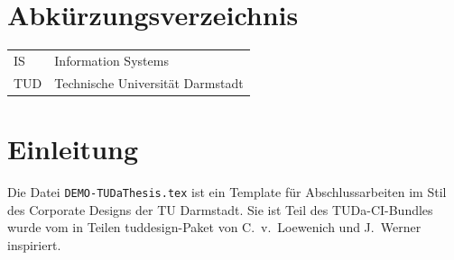 \documentclass[
	ngerman,
	ruledheaders=section,%
	class=report,%
	thesis={type=bachelor},%
	accentcolor=1b,%
	custommargins=true,%
	marginpar=false,%
	parskip=half-,%
	fontsize=11pt,%
	DIV=14,
]{tudapub}
\let\file\texttt
\begin{document}
\listoffigures
{}           %

\listoftables
{}           %

\chapter*{Abkürzungsverzeichnis}

\begin{xtabular}{ll}
IS					&	Information Systems\\
TUD						&	Technische Universität Darmstadt\\

\end{xtabular} 


\onehalfspacing
\chapter{Einleitung}
\setcounter{seitenzahlroemisch}{\value{page}}

Die Datei \file{DEMO-TUDaThesis.tex} ist ein Template für Abschlussarbeiten im Stil des Corporate Designs der TU Darmstadt.
Sie ist Teil des TUDa-CI-Bundles wurde vom in Teilen tuddesign-Paket von C.~v.~Loewenich und J.~Werner inspiriert.
\end{document}
